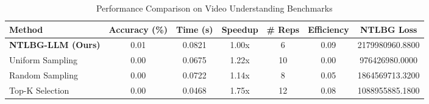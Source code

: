 
\begin{table}[htbp]
\centering
\caption{Performance Comparison on Video Understanding Benchmarks}
\label{tab:main_results}
\begin{tabular}{lcccccc}
\toprule
\textbf{Method} & \textbf{Accuracy (\%)} & \textbf{Time (s)} & \textbf{Speedup} & \textbf{\# Reps} & \textbf{Efficiency} & \textbf{NTLBG Loss} \\
\midrule
\textbf{NTLBG-LLM (Ours)} & 0.01 & 0.0821 & 1.00x & 6 & 0.09 & 2179980960.8800 \\
Uniform Sampling & 0.00 & 0.0675 & 1.22x & 10 & 0.00 & 976426980.0000 \\
Random Sampling & 0.00 & 0.0722 & 1.14x & 8 & 0.05 & 1864569713.3200 \\
Top-K Selection & 0.00 & 0.0468 & 1.75x & 12 & 0.08 & 1088955885.1800 \\
\bottomrule
\end{tabular}
\end{table}
